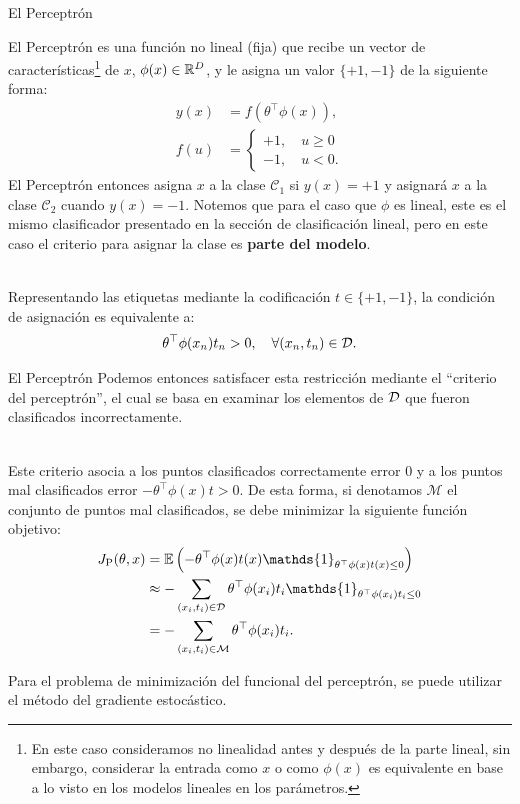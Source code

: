 \documentclass[handout, 9pt]{beamer}
\begin{document}
\begin{frame}{El Perceptrón}

El Perceptrón es una función no lineal (fija) que recibe un vector de características\footnote{En este caso consideramos no linealidad antes y después de la parte lineal, sin embargo, considerar la entrada como $x$ o  como $\phi(x)$ es  equivalente en base a lo  visto en los modelos lineales en los parámetros. } de $x$, $\phi(x)\in\mathbb{R}^D$, y le asigna un valor $\{+1,-1\}$ de la siguiente forma:
\begin{align*}
  y(x) &= f(\theta^\top\phi(x)),\\
  f(u) &= \left\{\begin{matrix}
  +1,\quad u\geq 0\\
  -1,\quad u<0.
  \end{matrix}\right.
\end{align*} \pause
El Perceptrón entonces asigna $x$ a la clase $\mathcal{C}_1$ si $y(x)=+1$ y asignará $x$ a la clase $\mathcal{C}_2$ cuando $y(x)=-1$. Notemos que  para  el caso que $\phi$ es lineal, este es el mismo clasificador presentado en la sección de clasificación lineal, pero en este caso el criterio para asignar la clase es \textbf{parte del modelo}. \\~\

Representando las etiquetas mediante la codificación $t\in\{+1,-1\}$, la condición de asignación es equivalente a:
\begin{equation*}
  \theta^\top\phi(x_n)t_n > 0,\quad \forall (x_n,t_n) \in {\mathcal D}.
\end{equation*}

\end{frame}

\begin{frame}{El Perceptrón}
Podemos entonces satisfacer esta restricción mediante el ``criterio del perceptrón'', el cual se basa en examinar  los elementos de ${\mathcal D}$ que fueron clasificados incorrectamente.\\~\ 

 Este criterio asocia a los puntos clasificados correctamente error 0 y a los puntos mal clasificados error $-\theta^\top\phi(x)t>0$. De esta forma, si denotamos $\mathcal{M}$ el conjunto de puntos mal clasificados, se debe minimizar la siguiente función objetivo: 
\begin{align*}
  J_\text{P}(\theta,x) &= \E\left(-\theta^\top\phi(x)t(x)\mathds{1}_{\theta^\top\phi(x)t(x)\leq 0} \right) \\
&\approx -\sum_{(x_i,t_i)\in \mathcal{D}}\theta^\top\phi(x_i)t_i \mathds{1}_{\theta^\top\phi(x_i)t_i\leq 0} \\
&= -\sum_{(x_i,t_i)\in \mathcal{M}}\theta^\top\phi(x_i)t_i.
\end{align*} 

Para el problema de minimización del funcional del perceptrón, se puede utilizar el método del gradiente estocástico.

\end{frame}
\end{document}
